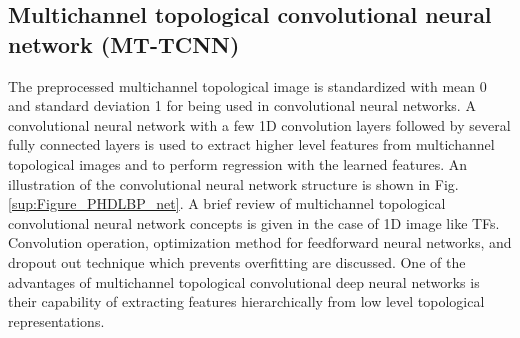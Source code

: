 \documentclass[10pt]{article}
\begin{document}

\subsection{Multichannel topological convolutional neural network (MT-TCNN)}

The preprocessed multichannel topological image is standardized with mean 0 and standard deviation 1 for being used in convolutional neural networks. A convolutional neural network with a few 1D convolution layers followed by several fully connected layers is used to extract higher level features from multichannel topological images  and to perform regression with the learned features. An illustration of the convolutional neural network structure is shown in Fig. \ref{sup:Figure_PHDLBP_net}. A brief review of  multichannel topological convolutional neural network concepts is given in the case of 1D image like TFs. Convolution operation, optimization method for feedforward neural networks, and dropout out technique which prevents overfitting are discussed. One of the advantages of  multichannel  topological convolutional deep neural networks is their capability of extracting features hierarchically from low level topological representations. 
\end{document}
